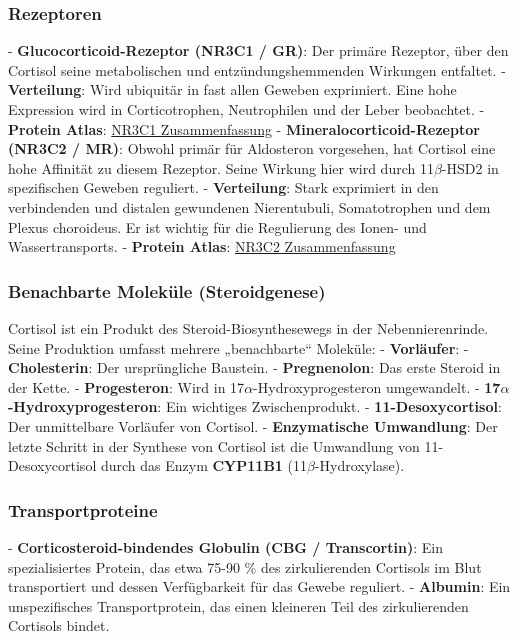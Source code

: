 \documentclass{article}
\begin{document}
\subsubsection{Rezeptoren}
- \textbf{Glucocorticoid-Rezeptor (NR3C1 / GR)}: Der primäre Rezeptor, über den Cortisol seine metabolischen und entzündungshemmenden Wirkungen entfaltet.
    - \textbf{Verteilung}: Wird ubiquitär in fast allen Geweben exprimiert. Eine hohe Expression wird in Corticotrophen, Neutrophilen und der Leber beobachtet.
    - \textbf{Protein Atlas}: \href{https://www.proteinatlas.org/ENSG00000113580-NR3C1}{NR3C1 Zusammenfassung}
- \textbf{Mineralocorticoid-Rezeptor (NR3C2 / MR)}: Obwohl primär für Aldosteron vorgesehen, hat Cortisol eine hohe Affinität zu diesem Rezeptor. Seine Wirkung hier wird durch 11\texorpdfstring{$\beta$}{beta}-HSD2 in spezifischen Geweben reguliert.
    - \textbf{Verteilung}: Stark exprimiert in den verbindenden und distalen gewundenen Nierentubuli, Somatotrophen und dem Plexus choroideus. Er ist wichtig für die Regulierung des Ionen- und Wassertransports.
    - \textbf{Protein Atlas}: \href{https://www.proteinatlas.org/ENSG00000151623-NR3C2}{NR3C2 Zusammenfassung}

\subsubsection{Benachbarte Moleküle (Steroidgenese)}
Cortisol ist ein Produkt des Steroid-Biosynthesewegs in der Nebennierenrinde. Seine Produktion umfasst mehrere „benachbarte“ Moleküle:
- \textbf{Vorläufer}:
    - \textbf{Cholesterin}: Der ursprüngliche Baustein.
    - \textbf{Pregnenolon}: Das erste Steroid in der Kette.
    - \textbf{Progesteron}: Wird in 17\texorpdfstring{$\alpha$}{alpha}-Hydroxyprogesteron umgewandelt.
    - \textbf{17\texorpdfstring{$\alpha$}{alpha}-Hydroxyprogesteron}: Ein wichtiges Zwischenprodukt.
    - \textbf{11-Desoxycortisol}: Der unmittelbare Vorläufer von Cortisol.
- \textbf{Enzymatische Umwandlung}: Der letzte Schritt in der Synthese von Cortisol ist die Umwandlung von 11-Desoxycortisol durch das Enzym \textbf{CYP11B1} (11\texorpdfstring{$\beta$}{beta}-Hydroxylase).

\subsubsection{Transportproteine}
- \textbf{Corticosteroid-bindendes Globulin (CBG / Transcortin)}: Ein spezialisiertes Protein, das etwa 75-90 \% des zirkulierenden Cortisols im Blut transportiert und dessen Verfügbarkeit für das Gewebe reguliert.
- \textbf{Albumin}: Ein unspezifisches Transportprotein, das einen kleineren Teil des zirkulierenden Cortisols bindet.
\end{document}
